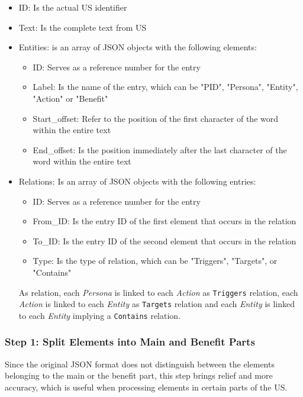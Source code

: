 \begin{itemize}
	\item ID: Is the actual US identifier
	
	\item Text: Is the complete text from US
	
	\item Entities: is an array of JSON objects with the following elements:
	\begin{itemize}
		\item ID: Serves as a reference number for the entry
		
		\item Label: Is the name of the entry, which can be "PID", "Persona", "Entity", "Action" or "Benefit"
		
		\item Start\_offset: Refer to the position of the first character of the word within the entire text
		
		\item End\_offset: Is the position immediately after the last character of the word within the entire text
	\end{itemize}
	\item Relations: Is an array of JSON objects with the following entries:
	\begin{itemize}
		\item ID: Serves as a reference number for the entry
		
		\item From\_ID: Is the entry ID of the first element that occurs in the relation
		
		\item To\_ID: Is the entry ID of the second element that occurs in the relation
		
		\item Type: Is the type of relation, which can be "Triggers", "Targets", or "Contains"
	\end{itemize}
	As relation, each \emph{Persona} is linked to each \emph{Action} as \texttt{Triggers} relation, each \emph{Action} is linked to each \emph{Entity} as \texttt{Targets} relation and each \emph{Entity} is linked to each \emph{Entity} implying a \texttt{Contains} relation.
\end{itemize}
\subsubsection*{Step 1: Split Elements into Main and Benefit Parts}\label{conflict_design_step_1}
Since the original JSON format does not distinguish between the elements belonging to the main or the benefit part, this step brings relief and more accuracy, which is useful when processing elements in certain parts of the US.

